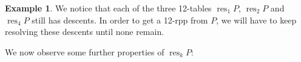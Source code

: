 \documentclass[12pt]{article}
\theoremstyle{plain}
\theoremstyle{definition}
\newtheorem{example}[theorem]{Example}
\begin{document}
\begin{example}
\begin{comment}
\end{comment}

We notice that each of the three 12-tables $\operatorname*{res}\nolimits_{1}%
P$, $\operatorname*{res}\nolimits_{2}P$ and $\operatorname*{res}%
\nolimits_{4}P$ still has descents. In order to get a 12-rpp from
$P$, we will have to keep resolving these descents until none remain.
\end{example}


We now observe some further properties of $\operatorname*{res}\nolimits_{k}P$:
\end{document}
